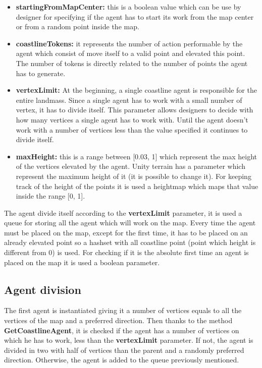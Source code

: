 \documentclass[12pt]{article}
\begin{document}
    \begin{itemize}
        \item \textbf{startingFromMapCenter:} this is a boolean value which can be use by designer for specifying if the agent has to start its work from the map center or
        from a random point inside the map.
        \item \textbf{coastlineTokens:} it represents the number of action performable by the agent which consist of move itself to a valid point and elevated this point. 
        The number of tokens is directly related to the number of points the agent has to generate.
        \item \textbf{vertexLimit:} At the beginning, a single coastline agent is responsible for the entire landmass. Since a single agent has to work with a small number
        of vertex, it has to divide itself. This parameter allows designers to decide with how many vertices a single agent has to work with. Until the agent doesn't
        work with a number of vertices less than the value specified it continues to divide itself.
        \item \textbf{maxHeight:} this is a range between [0.03, 1] which represent the max height of the vertices elevated by the agent. Unity terrain has a parameter which 
        represent the maximum height of it (it is possible to change it). For keeping track of the height of the points it is used a heightmap which maps that value inside 
        the range [0, 1].
    \end{itemize}

    The agent divide itself according to the \textbf{vertexLimit} parameter, it is used a queue for storing all the agent which will work on the map. 
    Every time the agent must be placed on the map, except for the first time, it has to be placed on an already elevated point so a hashset with all coastline point
    (point which height is different from 0) is used. For checking if it is the absolute first time an agent is placed on the map it is used a boolean parameter. 

    \subsection{Agent division}
    The first agent is instantiated giving it a number of vertices equals to all the vertices of the map and a preferred direction. Then thanks to the method \textbf{GetCoastlineAgent},
    it is checked if the agent has a number of vertices on which he has to work, less than the \textbf{vertexLimit} parameter. If not, the agent is divided in two with half
    of vertices than the parent and a randomly preferred direction. Otherwise, the agent is added to the queue previously mentioned.  
\end{document}
